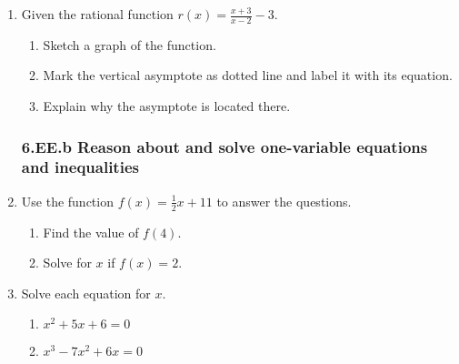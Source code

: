 \documentclass[12pt, twoside]{article}
\begin{document}
\begin{enumerate}[itemsep=0.5cm]
\item Given the rational function $\displaystyle r(x)= \frac{x+3}{x-2}-3$. %
        \begin{enumerate}[itemsep=0.25cm]
            \item Sketch a graph of the function.
            \item Mark the vertical asymptote as dotted line and label it with its equation.
            \item Explain why the asymptote is located there.
        \end{enumerate}
        \begin{center}
        \end{center}


\newpage
\subsubsection*{6.EE.b Reason about and solve one-variable equations and inequalities}

\item Use the function $f(x) = \frac{1}{2}x + 11$ to answer the questions.
    \begin{multicols}{2}
    \begin{enumerate}[itemsep=2cm]
        \item Find the value of $f(4)$.
        \item Solve for $x$ if $f(x) = 2$.
    \end{enumerate}
    \end{multicols} \vspace{3cm}

    
\item Solve each equation for $x$.
\begin{multicols}{2}
    \begin{enumerate}
    \item $x^2+5x+6 = 0$
    \item $x^3-7x^2+6x = 0$ 
    \end{enumerate} 
\end{multicols}


\end{enumerate}
\end{document}
